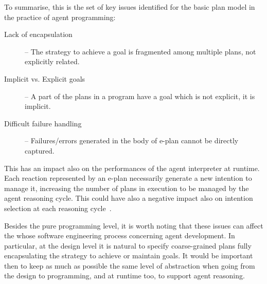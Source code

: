 
\bigskip

To summarise, this is the set of key issues identified for the basic plan model in the practice of agent programming:
%
\begin{description}
%
\item[Lack of encapsulation]  -- The strategy to achieve a goal is fragmented among multiple plans, not explicitly related.
%
\item[Implicit vs. Explicit goals]  -- A part of the plans in a program have a goal which is not explicit, it is implicit.
%
\item[Difficult failure handling] -- Failures/errors generated in the body of e-plan cannot be directly captured.
%
\end{description}

\noindent This has an impact also on the performances of the agent interpreter at runtime. Each reaction represented by an e-plan necessarily generate a new intention to manage it, increasing the number of plans in execution to be managed by the agent reasoning cycle.
%
This could have also a negative impact also on intention selection at each reasoning cycle~\cite{DBLP:conf/atal/LoganTY17}.

%


Besides the pure programming level, it is worth noting that these issues can affect the whose software engineering process concerning agent development. 
In particular, at the design level it is natural to specify coarse-grained plans fully encapsulating the strategy to achieve or maintain goals.
%
It would be important then to keep as much as possible the same level of abstraction when going from the design to programming, and at runtime too, to support agent reasoning.


%
%


